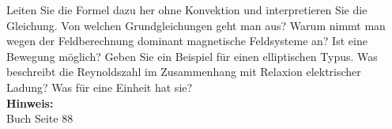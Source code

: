 \begin{question}[section=3,subsection=33,name={Relaxion und Konvektion},difficulty=,type=mdl,mode=exm,tags={}]
	Leiten Sie die Formel dazu her ohne Konvektion und interpretieren Sie die Gleichung. Von welchen Grundgleichungen geht man aus? Warum nimmt man wegen der Feldberechnung dominant magnetische Feldsysteme an? Ist eine Bewegung möglich? Geben Sie ein Beispiel für einen elliptischen Typus. Was beschreibt die Reynoldszahl im Zusammenhang mit Relaxion elektrischer Ladung? Was für eine Einheit hat sie?
	\\ \textbf{Hinweis:}\\
	Buch Seite 88
\end{question}
\begin{solution}
	
\end{solution}